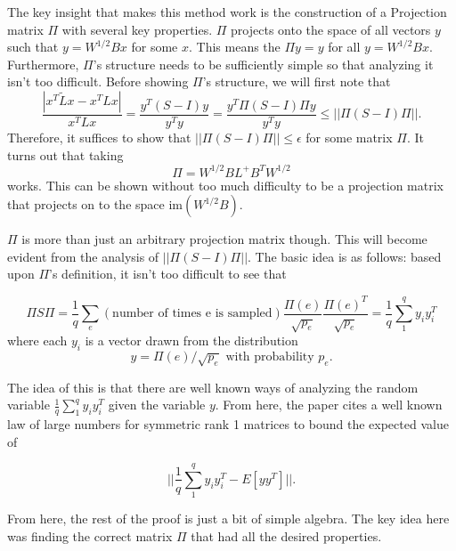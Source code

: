 \documentclass[12pt,twoside]{article}
\begin{document}
The key insight that makes this method work is the construction of a Projection matrix $\Pi$ with several key properties. $\Pi$ projects onto the space of all vectors $y$ such that $y = W^{1/2}Bx$ for some $x$. This means the $\Pi y = y$ for all $y = W^{1/2}Bx$. Furthermore, $\Pi$'s structure needs to be sufficiently simple so that analyzing it isn't too difficult. Before showing $\Pi$'s structure, we will first note that 
%
\begin{equation*}
\frac{|x^T\tilde{L}x - x^TLx|}{x^TLx} = \frac{y^T(S-I)y}{y^Ty} 
            = \frac{y^T\Pi(S-I)\Pi y}{y^Ty} \leq ||\Pi(S-I)\Pi||.
\end{equation*}
%
Therefore, it suffices to show that $||\Pi(S-I)\Pi|| \leq \epsilon$ for some matrix $\Pi$. It turns out that taking
%
\begin{equation}
\Pi = W^{1/2}BL^+B^TW^{1/2}
\end{equation}
%
works. This can be shown without too much difficulty to be a projection matrix that projects on to the space $\text{im}(W^{1/2}B)$. 

$\Pi$ is more than just an arbitrary projection matrix though. This will become evident from the analysis of $||\Pi(S-I)\Pi||$. The basic idea is as follows: based upon $\Pi$'s definition, it isn't too difficult to see that 

\begin{equation*}
\Pi S \Pi = \frac{1}{q}\sum_{e}(\text{number of times e is sampled})\frac{\Pi(e)}{\sqrt{p_e}}\frac{\Pi(e)^T}{\sqrt{p_e}}= \frac{1}{q}\sum_1^q y_iy_i^T
\end{equation*}
%
where each $y_i$ is a vector drawn from the distribution
%
\begin{equation*}
y = \Pi(e)/\sqrt{p_e} \text{ with probability } p_e.
\end{equation*}

The idea of this is that there are well known ways of analyzing the random variable $\frac{1}{q}\sum_1^q y_iy_i^T$ given the variable $y$. From here, the paper cites a well known law of large numbers for symmetric rank 1 matrices to bound the expected value of 

\begin{equation*}
||\frac{1}{q}\sum_1^q y_iy_i^T - E[yy^T]||.
\end{equation*}

From here, the rest of the proof is just a bit of simple algebra. The key idea here was finding the correct matrix $\Pi$ that had all the desired properties.
\end{document}
